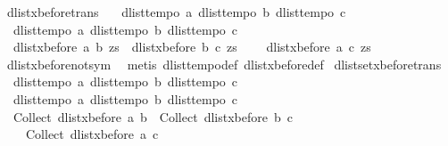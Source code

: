 \begin{isabellebody}
\endisatagproof
{\isafoldproof}%
%
\isadelimproof
%
\endisadelimproof
%
\isamarkuptrue%
\isamarkupfalse%
\ dlist{\isacharunderscore}xbefore{\isacharunderscore}trans{\isacharcolon}\ {\isachardoublequoteopen}\isanewline
\ \ {\isasymlbrakk}dlist{\isacharunderscore}tempo{}\ a{\isacharsemicolon}\ dlist{\isacharunderscore}tempo{}\ b{\isacharsemicolon}\ dlist{\isacharunderscore}tempo{}\ c{\isasymrbrakk}\ {\isasymLongrightarrow}\isanewline
\ \ {\isasymlbrakk}dlist{\isacharunderscore}tempo{}\ a{\isacharsemicolon}\ dlist{\isacharunderscore}tempo{}\ b{\isacharsemicolon}\ dlist{\isacharunderscore}tempo{}\ c{\isasymrbrakk}\ {\isasymLongrightarrow}\ \ \ \isanewline
\ \ dlist{\isacharunderscore}xbefore\ a\ b\ zs\ {\isasymand}\ dlist{\isacharunderscore}xbefore\ b\ c\ zs\ {\isasymLongrightarrow}\ \isanewline
\ \ dlist{\isacharunderscore}xbefore\ a\ c\ zs{\isachardoublequoteclose}\isanewline
%
\isadelimproof
%
\endisadelimproof
%
\isatagproof
{}\isamarkupfalse%
\ dlist{\isacharunderscore}xbefore{\isacharunderscore}not{\isacharunderscore}sym\ \isanewline
{}\isamarkupfalse%
\ {\isacharparenleft}metis\ dlist{\isacharunderscore}tempo{}{\isacharunderscore}def\ dlist{\isacharunderscore}xbefore{\isacharunderscore}def{\isacharparenright}%
\endisatagproof
{\isafoldproof}%
%
\isadelimproof
\isanewline
%
\endisadelimproof
\isanewline
{}\isamarkupfalse%
\ dlistset{\isacharunderscore}xbefore{\isacharunderscore}trans{\isacharcolon}\ {\isachardoublequoteopen}\isanewline
\ \ {\isasymlbrakk}dlist{\isacharunderscore}tempo{}\ a{\isacharsemicolon}\ dlist{\isacharunderscore}tempo{}\ b{\isacharsemicolon}\ dlist{\isacharunderscore}tempo{}\ c{\isasymrbrakk}\ {\isasymLongrightarrow}\isanewline
\ \ {\isasymlbrakk}dlist{\isacharunderscore}tempo{}\ a{\isacharsemicolon}\ dlist{\isacharunderscore}tempo{}\ b{\isacharsemicolon}\ dlist{\isacharunderscore}tempo{}\ c{\isasymrbrakk}\ {\isasymLongrightarrow}\isanewline
\ \ {\isacharparenleft}Collect\ {\isacharparenleft}dlist{\isacharunderscore}xbefore\ a\ b{\isacharparenright}\ {\isasyminter}\ Collect\ {\isacharparenleft}dlist{\isacharunderscore}xbefore\ b\ c{\isacharparenright}{\isacharparenright}\ {\isasymsubseteq}\ \isanewline
\ \ \ \ Collect\ {\isacharparenleft}dlist{\isacharunderscore}xbefore\ a\ c{\isacharparenright}{\isachardoublequoteclose}\isanewline
%
\isadelimproof
%
\endisadelimproof

\end{isabellebody}
